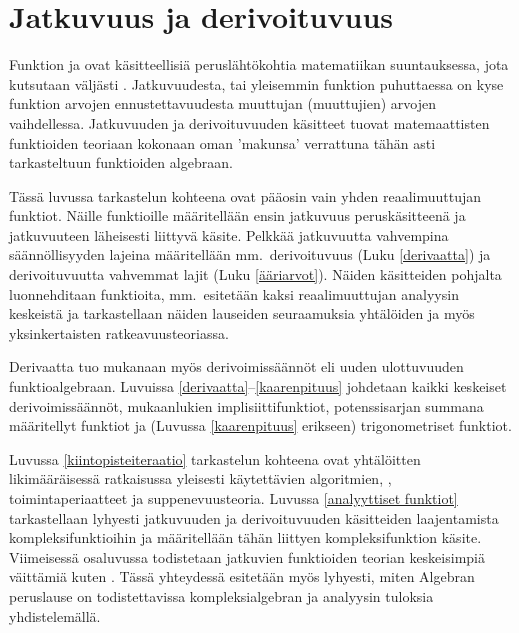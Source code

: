 \chapter{Jatkuvuus ja derivoituvuus}  \label{jatkuvat funktiot}

Funktion  ja  ovat käsitteellisiä peruslähtökohtia 
matematiikan suuntauksessa, jota kutsutaan väljästi . Jatkuvuudesta, tai 
yleisemmin funktion  puhuttaessa on kyse funktion arvojen
ennustettavuudesta muuttujan (muuttujien) arvojen vaihdellessa. Jatkuvuuden ja derivoituvuuden
käsitteet tuovat matemaattisten funktioiden teoriaan kokonaan oman 'makunsa' verrattuna
tähän asti tarkasteltuun funktioiden algebraan.

Tässä luvussa tarkastelun kohteena ovat pääosin vain yhden reaalimuuttujan funktiot. Näille
funktioille määritellään ensin jatkuvuus peruskäsitteenä ja jatkuvuuteen läheisesti liittyvä
 käsite. Pelkkää jatkuvuutta vahvempina säännöllisyyden lajeina
määritellään mm.\ derivoituvuus (Luku \ref{derivaatta}) ja derivoituvuutta vahvemmat 
 lajit (Luku \ref{ääriarvot}). Näiden käsitteiden pohjalta luonnehditaan
funktioita, mm.\ esitetään kaksi reaalimuuttujan analyysin keskeistä  ja
tarkastellaan näiden lauseiden seuraamuksia yhtälöiden ja myös yksinkertaisten 
 ratkeavuusteoriassa. 

Derivaatta tuo mukanaan myös derivoimissäännöt eli uuden ulottuvuuden funktioalgebraan.
Luvuissa \ref{derivaatta}--\ref{kaarenpituus} johdetaan kaikki keskeiset derivoimissäännöt,
mukaanlukien implisiittifunktiot, potenssisarjan summana määritellyt funktiot ja
(Luvussa \ref{kaarenpituus} erikseen) trigonometriset funktiot. 

Luvussa \ref{kiintopisteiteraatio} tarkastelun kohteena ovat yhtälöitten likimääräisessä
ratkaisussa yleisesti käytettävien algoritmien, ,
toimintaperiaatteet ja suppenevuusteoria. Luvussa \ref{analyyttiset funktiot} tarkastellaan
lyhyesti jatkuvuuden ja derivoituvuuden käsitteiden laajentamista kompleksifunktioihin ja
määritellään tähän liittyen  kompleksifunktion käsite. Viimeisessä
osaluvussa todistetaan jatkuvien funktioiden teorian keskeisimpiä väittämiä kuten 
. Tässä yhteydessä esitetään myös lyhyesti, miten Algebran peruslause
on todistettavissa kompleksialgebran ja analyysin tuloksia yhdistelemällä.
